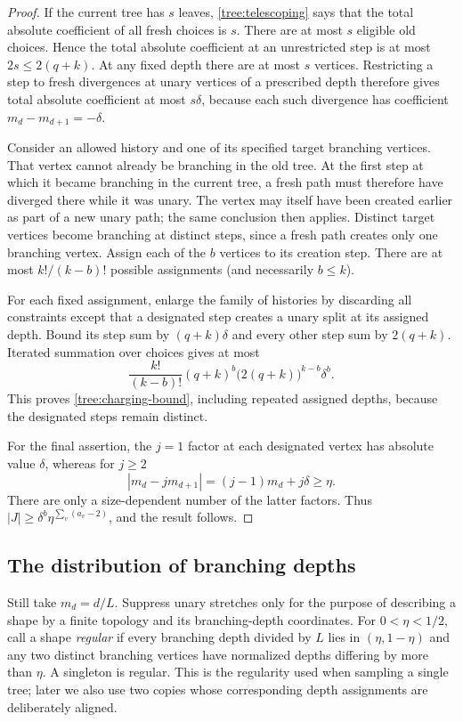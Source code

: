 \begin{proof}
If the current tree has $s$ leaves, \eqref{tree:telescoping} says
that the total absolute coefficient of all fresh choices is $s$.
There are at most $s$ eligible old choices.  Hence the total absolute
coefficient at an unrestricted step is at most $2s\leq2(q+k)$.
At any fixed depth there are at most $s$ vertices.  Restricting a
step to fresh divergences at unary vertices of a prescribed depth
therefore gives total absolute coefficient at most $s\delta$, because
each such divergence has coefficient $m_d-m_{d+1}=-\delta$.

Consider an allowed history and one of its specified target
branching vertices.  That vertex cannot already be branching in the
old tree.  At the first step at which it became branching in the
current tree, a fresh path must therefore have diverged there while
it was unary.  The vertex may itself have been created earlier as
part of a new unary path; the same conclusion then applies.  Distinct
target vertices become branching at distinct steps, since a fresh
path creates only one branching vertex.  Assign each of the $b$
vertices to its creation step.  There are at most
$k!/(k-b)!$ possible assignments (and necessarily $b\leq k$).

For each fixed assignment, enlarge the family of histories by
discarding all constraints except that a designated step creates a
unary split at its assigned depth.  Bound its step sum by
$(q+k)\delta$ and every other step sum by $2(q+k)$.  Iterated summation
over choices gives at most
\[
 \frac{k!}{(k-b)!}(q+k)^b\bigl(2(q+k)\bigr)^{k-b}\delta^b.
\]
This proves \eqref{tree:charging-bound}, including repeated assigned
depths, because the designated steps remain distinct.

For the final assertion, the $j=1$ factor at each designated vertex
has absolute value $\delta$, whereas for $j\geq2$
\[
  |m_d-jm_{d+1}|=(j-1)m_d+j\delta\geq\eta.
\]
There are only a size-dependent number of the latter factors.  Thus
$|J|\geq\delta^b\eta^{\sum_v(a_v-2)}$, and the result follows.
\end{proof}

\subsection{The distribution of branching depths}

Still take $m_d=d/L$.  Suppress unary stretches only for the purpose
of describing a shape by a finite topology and its branching-depth
coordinates.  For $0<\eta<1/2$, call a shape \emph{regular} if every
branching depth divided by $L$ lies in $(\eta,1-\eta)$ and any two
distinct branching vertices have normalized depths differing by more
than $\eta$.  A singleton is regular.  This is the regularity used
when sampling a single tree; later we also use two copies whose
corresponding depth assignments are deliberately aligned.

